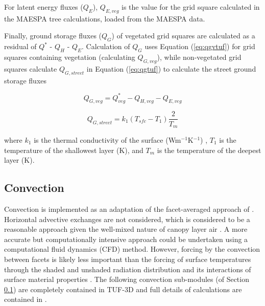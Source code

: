 \documentclass[final,3p,times,authoryear]{elsarticle}
\begin{document}

For latent energy fluxes ($Q_{E}$), $Q_{E,veg}$ is the value for the grid square calculated in the MAESPA tree calculations, loaded from the MAESPA data.


Finally, ground storage fluxes ($Q_{G}$) of vegetated grid squares are calculated as a residual of $Q^{*}$ - $Q_{H}$ - $Q_{E}$. Calculation of $Q_{G}$ uses Equation (\ref{eq:qgvtuf}) for grid squares containing vegetation (calculating $Q_{G,veg}$), while non-vegetated grid squares calculate $Q_{G,street}$ in Equation (\ref{eq:qgtuf}) to calculate the street ground storage fluxes

\begin{equation}\label{eq:qgvtuf}
 Q_{G,veg} =  Q^{*}_{veg} - Q_{H,veg} - Q_{E,veg}
\end{equation}

\begin{equation}\label{eq:qgtuf}
 Q_{G,street} = k_{1}  ( T_{sfc} - T_{1} ) \frac {2}{T_{m}}
\end{equation}

where $k_{1}$ is the thermal conductivity of the surface (Wm$^{-1}$K$^{-1}$) , $T_{1}$ is the temperature of the shallowest layer (K), and $T_{m}$ is the temperature of the deepest layer (K).


\subsection{Convection}\label{sec:convection}
Convection is implemented as an adaptation of the facet-averaged approach of \cite{Masson2000}. Horizontal advective exchanges are not considered, which is considered to be a reasonable approach given the well-mixed nature of canopy layer air \citep{Krayenhoff2007}. A more accurate but computationally intensive approach could be undertaken using a computational fluid dynamics (CFD) method. However, forcing by the convection between facets is likely less important than the forcing of surface temperatures through the shaded and unshaded radiation distribution and its interactions of surface material properties \citep{Krayenhoff2007}. The following convection sub-modules (of Section \ref{sec:convection}) are completely contained in TUF-3D and full details of calculations are contained in \cite{Krayenhoff2007}.
\end{document}
